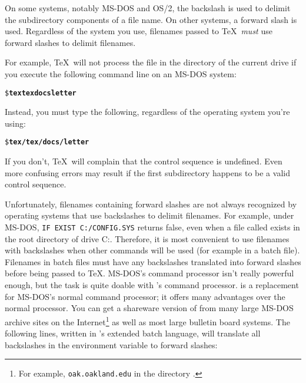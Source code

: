 On some systems, notably MS-DOS and OS/2, the 
backslash
is
used to delimit the subdirectory components of a file name.  On other
systems, a forward slash is used.  Regardless of the system you use,
filenames passed to \TeX\ {\em must\/} use forward slashes to
delimit filenames.

For example, \TeX\ will not process the file 
in the  directory of the current drive if
you execute the following command line on an MS-DOS system:

\begin{exindent}
\begin{alltt}
\$ \textbf{tex {\bs}tex{\bs}docs{\bs}letter}
\end{alltt}
\end{exindent}

Instead, you must type the following, regardless of the operating system
you're using:

\begin{exindent}
\begin{alltt}
\$ \textbf{tex /tex/docs/letter}
\end{alltt}
\end{exindent}

If you don't, \TeX\ will complain that the control sequence
 is undefined.  Even more confusing errors may result
if the first subdirectory happens to be a valid control sequence.

Unfortunately, filenames containing forward slashes are not always
recognized by operating systems that use backslashes to delimit
filenames.  For example, under MS-DOS, \verb|IF EXIST C:/CONFIG.SYS|
returns false,
even when a file called  exists in
the root directory of drive C:.  Therefore, it is most convenient to
use filenames with backslashes when other commands will be used (for
example in a batch file).  Filenames in batch files must have any
backslashes translated into forward slashes before being passed to
\TeX.  MS-DOS's command processor isn't really powerful enough, but
the task is quite doable with 's  command
processor.   is a replacement for MS-DOS's normal
command processor; it offers many advantages over the normal
processor.  You can get a shareware version of  from
many large MS-DOS archive sites on the Internet\footnote{For example,
{\tt oak.oakland.edu} in the directory .} as well
as most large bulletin board systems.  The following lines, 
written in 's
extended batch language, will translate all backslashes in the
environment variable  to forward slashes:

